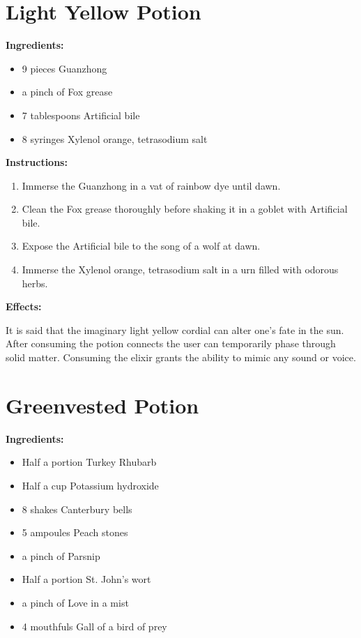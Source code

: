 \documentclass{article}
\begin{document}
\newpage
\section*{Light Yellow Potion}

\textbf{Ingredients:}

\begin{itemize}
  \item 9 pieces Guanzhong
  \item a pinch of Fox grease
  \item 7 tablespoons Artificial bile
  \item 8 syringes Xylenol orange, tetrasodium salt
\end{itemize}

\textbf{Instructions:}

\begin{enumerate}
  \item Immerse the Guanzhong in a vat of rainbow dye until dawn.
  \item Clean the Fox grease thoroughly before shaking it in a goblet with Artificial bile.
  \item Expose the Artificial bile to the song of a wolf at dawn.
  \item Immerse the Xylenol orange, tetrasodium salt in a urn filled with odorous herbs.
\end{enumerate}

\textbf{Effects:}

It is said that the imaginary light yellow cordial can alter one's fate in the sun. After consuming the potion connects the user can temporarily phase through solid matter. Consuming the elixir grants the ability to mimic any sound or voice.

\newpage
\section*{Greenvested Potion}

\textbf{Ingredients:}

\begin{itemize}
  \item Half a portion Turkey Rhubarb
  \item Half a cup Potassium hydroxide
  \item 8 shakes Canterbury bells
  \item 5 ampoules Peach stones
  \item a pinch of Parsnip
  \item Half a portion St. John's wort
  \item a pinch of Love in a mist
  \item 4 mouthfuls Gall of a bird of prey
\end{itemize}
\end{document}
